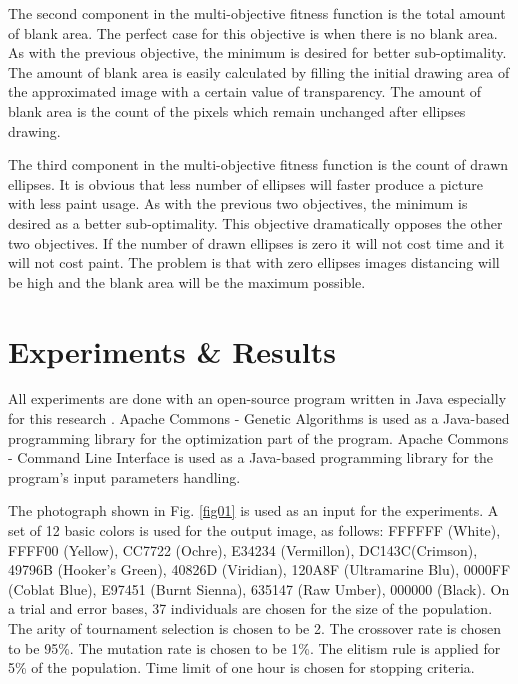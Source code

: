 \documentclass[conference]{IEEEtran}
\begin{document}
The second component in the multi-objective fitness function is the total amount of blank area. The perfect case for this objective is when there is no blank area. As with the previous objective, the minimum is desired for better sub-optimality. The amount of blank area is easily calculated by filling the initial drawing area of the approximated image with a certain value of transparency. The amount of blank area is the count of the pixels which remain unchanged after ellipses drawing. 

The third component in the multi-objective fitness function is the count of drawn ellipses. It is obvious that less number of ellipses will faster produce a picture with less paint usage. As with the previous two objectives, the minimum is desired as a better sub-optimality. This objective dramatically opposes the other two objectives. If the number of drawn ellipses is zero it will not cost time and it will not cost paint. The problem is that with zero ellipses images distancing will be high and the blank area will be the maximum possible. 

\section{Experiments \& Results}

All experiments are done with an open-source program written in Java especially for this research \cite{Balabanov-2020}. Apache Commons - Genetic Algorithms \cite{Apache-Commons-Genetic-Algorithms-2020} is used as a Java-based programming library for the optimization part of the program. Apache Commons - Command Line Interface \cite{Apache-Commons-Command-Line-Interface-2020} is used as a Java-based programming library for the program's input parameters handling.

The photograph shown in Fig. \ref{fig01} is used as an input for the experiments. A set of 12 basic colors is used for the output image, as follows:   FFFFFF (White), FFFF00 (Yellow), CC7722 (Ochre), E34234 (Vermillon), DC143C(Crimson), 49796B (Hooker's Green), 40826D (Viridian), 120A8F (Ultramarine Blu), 0000FF (Coblat Blue), E97451 (Burnt Sienna), 635147 (Raw Umber), 000000 (Black). On a trial and error bases, 37 individuals are chosen for the size of the population. The arity of tournament selection is chosen to be 2. The crossover rate is chosen to be 95\%. The mutation rate is chosen to be 1\%. The elitism rule is applied for 5\% of the population. Time limit of one hour is chosen for stopping criteria.
\end{document}
